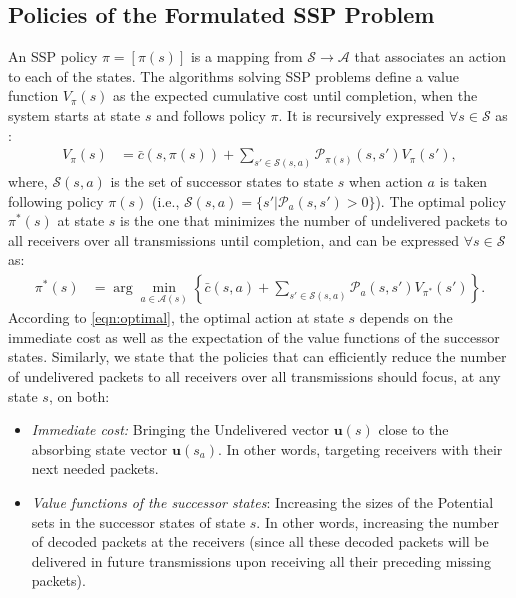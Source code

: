 \documentclass[12pt, peerreview, onecolumn]{IEEEtran}
\begin{document}
\subsection{Policies of the Formulated SSP Problem} \label{SSPproperties}
An SSP policy $\pi=[\pi(s)]$ is a mapping from  $\mathcal{S}\rightarrow\mathcal{A}$ that associates an action to each of the states.  The algorithms solving SSP problems define a value function $V_{\pi}(s)$ as the expected cumulative cost until completion, when the system starts at state $s$ and follows policy $\pi$. It is recursively expressed $\forall s\in\mathcal{S}$ as \cite{puterman2009markov}:
\begin{align}
V_{\pi}(s) &=   \bar{c}(s,\pi(s)) + \sum_{s' \in \mathcal{S}(s,a)} \mathcal{P}_{\pi(s)}(s,s')V_{\pi}(s'),
\end{align}
where, $\mathcal{S}(s,a)$ is the set of successor states to state $s$  when action $a$ is taken following policy $\pi(s)$ (i.e., $ \mathcal{S}(s,a) = \{s'|\mathcal{P}_{a}(s,s') > 0 \} $). The optimal policy $\pi^*(s)$ at  state $s$ is the one that minimizes the number of  undelivered packets to all receivers over all transmissions until completion, and  can be expressed $\forall s \in \mathcal{S}$ as:
\begin{align} \label{eqn:optimal}
\pi^*(s) &=  \arg\min_{a \in \mathcal{A}(s)} \left\{ \bar{c}(s,a) + \sum_{s' \in \mathcal{S}(s,a)} \mathcal{P}_{a}(s,s')V_{\pi^*}(s')  \right\}.
\end{align}
According to \eqref{eqn:optimal}, the optimal action at state $s$  depends on the immediate cost as well as the expectation of the value functions of the successor states. Similarly, we  state that the policies that can  efficiently reduce the  number of  undelivered packets to all receivers over all transmissions  should focus, at any  state $s$, on both:
\begin{itemize}
\item  \emph{Immediate cost:} Bringing the  Undelivered vector $\mathbf{u}(s)$ close to the absorbing state vector $\mathbf{u}(s_a)$. In other words, targeting receivers with their next needed packets.
\item  \emph{Value functions of the successor states}: Increasing the sizes of the Potential sets  in the  successor states  of state $s$. In other words, increasing the number of  decoded packets at the receivers (since all these decoded packets will be delivered in  future transmissions upon receiving all their preceding missing packets).
\end{itemize}
\vspace{-5mm}
\end{document}
